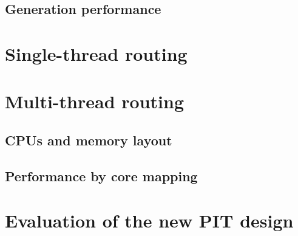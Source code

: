 \documentclass[12pt,a4paper,twoside]{book}
\begin{document}
\subsection{Generation performance}

\section{Single-thread routing}

\section{Multi-thread routing}\label{sec:test.multicore}

\subsection{CPUs and memory layout}\label{sec:test.multicore.layout}

\subsection{Performance by core mapping}\label{sec:test.multicore.performance}

\section{Evaluation of the new PIT design}\label{sec:test.pit}




\end{document}
